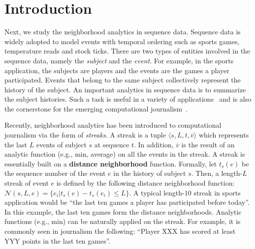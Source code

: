\section{Introduction}
Next, we study the neighborhood analytics in sequence data.
Sequence data is widely adopted %
to model events with temporal ordering such as
sports games, temperature reads and stock ticks.
There are two types of entities involved in the sequence data, 
namely the \emph{subject} and the \emph{event}. For example, in 
the sports application, the subjects are players and the events are the games
a player participated. Events that belong to the same
subject collectively represent the history of the subject. 
An important analytics in sequence data
is to summarize the subject histories.
Such a task is useful in a variety
of applications~\cite{} and is also the cornerstone for the emerging computational journalism~\cite{}.


Recently, neighborhood analytics has been introduced to computational journalism
via the form of \emph{streaks}. A streak is a tuple $\langle s, L, t, \overline{v} \rangle$
which represents the last $L$ events of subject $s$ at sequence $t$. In addition, $\overline{v}$
is the result of an analytic function (e.g., min, average)
on all the events in the streak. A streak is essentially 
built on  a \textbf{distance neighborhood} function. Formally,
let $t_s(e)$ be the sequence number of the event $e$ in the history of subject $s$.
Then, a length-$L$ streak of event $e$ is 
defined by the following distance neighborhood
function: $\mathcal{N}(s,L,e) = \{e_i | t_s(e) - t_s(e_i) \leq L \}$.
A typical length-$10$ streak in sports application would be
``the last ten games a player has participated before today''. 
In this example, the last ten games form the distance neighborhoods.
Analytic functions (e.g., min) can be naturally applied on the streak.
For example, it is commonly seen in journalism the following:
``Player XXX has scored at least YYY points in the last ten games''.

